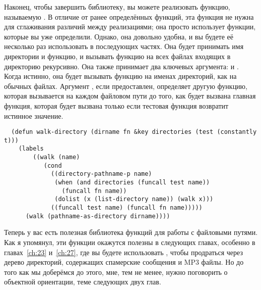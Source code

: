 Наконец, чтобы завершить библиотеку, вы можете реализовать функцию, называемую
. В отличие от ранее определённых функций, эта функция не нужна для
сглаживания различий между реализациями; она просто использует функции, которые вы уже
определили. Однако, она довольно удобна, и вы будете её несколько раз использовать в
последующих частях. Она будет принимать имя директории и функцию, и вызывать функцию на
всех файлах входящих в директорию рекурсивно. Она также принимает два ключевых аргумента:
 и . Когда  истинно, она будет вызывать
функцию на именах директорий, как на обычных файлах. Аргумент , если
предоставлен, определяет другую функцию, которая вызывается на каждом файловом пути до
того, как будет вызвана главная функция, которая будет вызвана только если тестовая
функция возвратит истинное значение.

\begin{lstlisting}
  (defun walk-directory (dirname fn &key directories (test (constantly t)))
    (labels
        ((walk (name)
           (cond
             ((directory-pathname-p name)
              (when (and directories (funcall test name))
                (funcall fn name))
              (dolist (x (list-directory name)) (walk x)))
             ((funcall test name) (funcall fn name)))))
      (walk (pathname-as-directory dirname))))
\end{lstlisting}

Теперь у вас есть полезная библиотека функций для работы с файловыми путями. Как я
упомянул, эти функции окажутся полезны в следующих главах, особенно в главах~\ref{ch:23}
и~\ref{ch:27}, где вы будете использовать , чтобы продраться через
дерево директорий, содержащих спамерские сообщения и MP3 файлы. Но до того как мы
доберёмся до этого, мне, тем не менее, нужно поговорить о объектной ориентации, теме
следующих двух глав.

